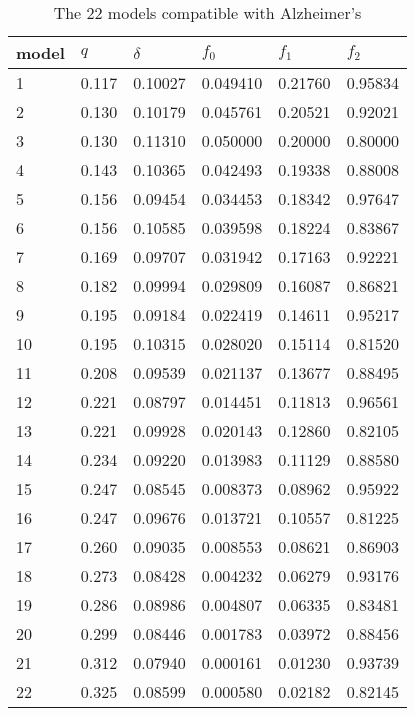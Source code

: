 \begin{table}[h]
\caption{The 22 models compatible with Alzheimer's\label{models6}}
\centering
\vskip 0.3cm
\begin{tabular}{llllll}
\hline
model &   $q$  & $\delta$ &    $f_0$ &    $f_1$  &    $f_2$\\
\hline
  1   & 0.117  & 0.10027  & 0.049410 &  0.21760  &  0.95834\\
  2   & 0.130  & 0.10179  & 0.045761 &  0.20521  &  0.92021\\
  3   & 0.130  & 0.11310  & 0.050000 &  0.20000  &  0.80000\\
  4   & 0.143  & 0.10365  & 0.042493 &  0.19338  &  0.88008\\
  5   & 0.156  & 0.09454  & 0.034453 &  0.18342  &  0.97647\\
  6   & 0.156  & 0.10585  & 0.039598 &  0.18224  &  0.83867\\
  7   & 0.169  & 0.09707  & 0.031942 &  0.17163  &  0.92221\\
  8   & 0.182  & 0.09994  & 0.029809 &  0.16087  &  0.86821\\
  9   & 0.195  & 0.09184  & 0.022419 &  0.14611  &  0.95217\\
 10   & 0.195  & 0.10315  & 0.028020 &  0.15114  &  0.81520\\
 11   & 0.208  & 0.09539  & 0.021137 &  0.13677  &  0.88495\\
 12   & 0.221  & 0.08797  & 0.014451 &  0.11813  &  0.96561\\
 13   & 0.221  & 0.09928  & 0.020143 &  0.12860  &  0.82105\\
 14   & 0.234  & 0.09220  & 0.013983 &  0.11129  &  0.88580\\
 15   & 0.247  & 0.08545  & 0.008373 &  0.08962  &  0.95922\\
 16   & 0.247  & 0.09676  & 0.013721 &  0.10557  &  0.81225\\
 17   & 0.260  & 0.09035  & 0.008553 &  0.08621  &  0.86903\\
 18   & 0.273  & 0.08428  & 0.004232 &  0.06279  &  0.93176\\
 19   & 0.286  & 0.08986  & 0.004807 &  0.06335  &  0.83481\\
 20   & 0.299  & 0.08446  & 0.001783 &  0.03972  &  0.88456\\
 21   & 0.312  & 0.07940  & 0.000161 &  0.01230  &  0.93739\\
 22   & 0.325  & 0.08599  & 0.000580 &  0.02182  &  0.82145\\
\hline
\end{tabular}
\end{table}

